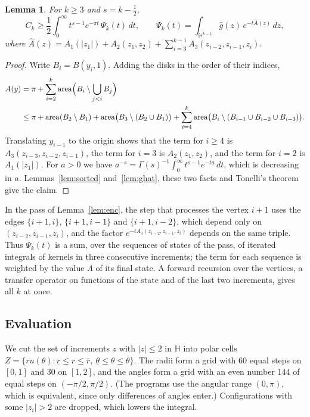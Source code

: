 \documentclass[11pt]{amsart}
\newtheorem{lemma}[theorem]{Lemma}
\theoremstyle{definition}
\theoremstyle{remark}
\numberwithin{equation}{section}
\newcommand{\area}{\operatorname{area}}
\newcommand{\WNone}{60}\newcommand{\WNtwo}{30}\newcommand{\WNt}{144}%
\begin{document}
\begin{lemma}\label{lem:laplace}
For $k\ge3$ and $s=k-\frac12$,
\[
C_k\ge\frac12\int_0^\infty t^{s-1}e^{-\pi t}\,\Psi_k(t)\,dt,\qquad\Psi_k(t)=\int_{\mathbb H^{k-1}}\hat g(z)\,e^{-t\hat A(z)}\,dz,
\]
where $\hat A(z)=A_1(|z_1|)+A_2(z_1,z_2)+\sum_{i=3}^{k-1}A_3(z_{i-2},z_{i-1},z_i)$.
\end{lemma}

\begin{proof}
Write $B_i=B(y_i,1)$. Adding the disks in the order of their indices,
\begin{align*}
A(y)&=\pi+\sum_{i=2}^k\area\Bigl(B_i\setminus\bigcup_{j<i}B_j\Bigr)\\
&\le\pi+\area(B_2\setminus B_1)+\area\bigl(B_3\setminus(B_2\cup B_1)\bigr)+\sum_{i=4}^k\area\bigl(B_i\setminus(B_{i-1}\cup B_{i-2}\cup B_{i-3})\bigr).
\end{align*}
Translating $y_{i-1}$ to the origin shows that the term for $i\ge4$ is $A_3(z_{i-3},z_{i-2},z_{i-1})$, the term for $i=3$ is $A_2(z_1,z_2)$, and the term for $i=2$ is $A_1(|z_1|)$. For $a>0$ we have $a^{-s}=\Gamma(s)^{-1}\int_0^\infty t^{s-1}e^{-ta}\,dt$, which is decreasing in $a$. Lemmas~\ref{lem:sorted} and~\ref{lem:ghat}, these two facts and Tonelli's theorem give the claim.
\end{proof}


In the pass of Lemma~\ref{lem:enc}, the step that processes the vertex $i+1$ uses the edges $\{i+1,i\}$, $\{i+1,i-1\}$ and $\{i+1,i-2\}$, which depend only on $(z_{i-2},z_{i-1},z_i)$, and the factor $e^{-tA_3(z_{i-2},z_{i-1},z_i)}$ depends on the same triple. Thus $\Psi_k(t)$ is a sum, over the sequences of states of the pass, of iterated integrals of kernels in three consecutive increments; the term for each sequence is weighted by the value $\Lambda$ of its final state. A forward recursion over the vertices, a transfer operator on functions of the state and of the last two increments, gives all $k$ at once.

\subsection{Evaluation}\label{sec:weval}
We cut the set of increments $z$ with $|z|\le2$ in $\mathbb H$ into polar cells $Z=\{ru(\theta):\underline r\le r\le\overline r,\ \underline\theta\le\theta\le\overline\theta\}$. The radii form a grid with $\WNone$ equal steps on $[0,1]$ and $\WNtwo$ on $[1,2]$, and the angles form a grid with an even number $\WNt$ of equal steps on $(-\pi/2,\pi/2)$. (The programs use the angular range $(0,\pi)$, which is equivalent, since only differences of angles enter.) Configurations with some $|z_i|>2$ are dropped, which lowers the integral.
\end{document}
